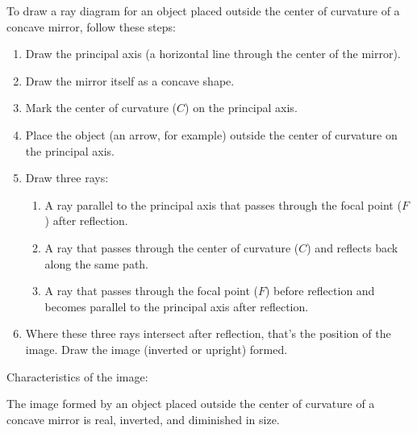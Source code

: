 \documentclass{article}
\begin{document}
To draw a ray diagram for an object placed outside the center of curvature of a concave mirror, follow these steps:

\begin{enumerate}
  \item Draw the principal axis (a horizontal line through the center of the mirror).
  \item Draw the mirror itself as a concave shape.
  \item Mark the center of curvature ($C$) on the principal axis.
  \item Place the object (an arrow, for example) outside the center of curvature on the principal axis.
  \item Draw three rays:
    \begin{enumerate}
      \item A ray parallel to the principal axis that passes through the focal point ($F$) after reflection.
      \item A ray that passes through the center of curvature ($C$) and reflects back along the same path.
      \item A ray that passes through the focal point ($F$) before reflection and becomes parallel to the principal axis after reflection.
    \end{enumerate}
  \item Where these three rays intersect after reflection, that's the position of the image. Draw the image (inverted or upright) formed.
\end{enumerate}

Characteristics of the image:

The image formed by an object placed outside the center of curvature of a concave mirror is real, inverted, and diminished in size.
\end{document}

